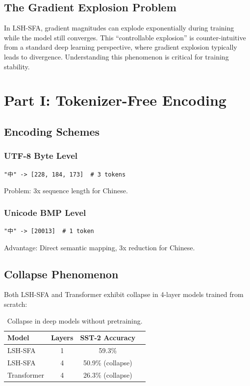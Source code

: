 \documentclass{article}
\begin{document}
\subsection{The Gradient Explosion Problem}

In LSH-SFA, gradient magnitudes can explode exponentially during training while the model still converges. This ``controllable explosion'' is counter-intuitive from a standard deep learning perspective, where gradient explosion typically leads to divergence. Understanding this phenomenon is critical for training stability.

\section{Part I: Tokenizer-Free Encoding}

\subsection{Encoding Schemes}

\subsubsection{UTF-8 Byte Level}

\begin{verbatim}
"中" -> [228, 184, 173]  # 3 tokens
\end{verbatim}

Problem: 3x sequence length for Chinese.

\subsubsection{Unicode BMP Level}

\begin{verbatim}
"中" -> [20013]  # 1 token
\end{verbatim}

Advantage: Direct semantic mapping, 3x reduction for Chinese.

\subsection{Collapse Phenomenon}

Both LSH-SFA and Transformer exhibit collapse in 4-layer models trained from scratch:

\begin{table}[h]
\centering
\caption{Collapse in deep models without pretraining.}
\label{tab:collapse}
\begin{tabular}{lccc}
\toprule
\textbf{Model} & \textbf{Layers} & \textbf{SST-2 Accuracy} \\
\midrule
LSH-SFA & 1 & 59.3\% \\
LSH-SFA & 4 & 50.9\% (collapse) \\
Transformer & 4 & 26.3\% (collapse) \\
\bottomrule
\end{tabular}
\end{table}
\end{document}
